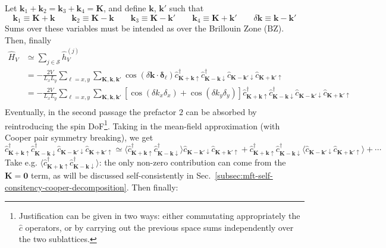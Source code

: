 Let $\mathbf{k}_1 + \mathbf{k}_2 = \mathbf{k}_3 + \mathbf{k}_4 = \mathbf{K}$, and define $\mathbf{k}$, $\mathbf{k}'$ such that
\[
	\mathbf{k}_1 \equiv \mathbf{K} + \mathbf{k} 
	\qquad
	\mathbf{k}_2 \equiv \mathbf{K} - \mathbf{k} 
	\qquad
	\mathbf{k}_3 \equiv \mathbf{K} - \mathbf{k}' 
	\qquad
	\mathbf{k}_4 \equiv \mathbf{K} + \mathbf{k}'
	\qquad
	\delta \mathbf{k} \equiv \mathbf{k}-\mathbf{k}'
\]
Sums over these variables must be intended as over the Brillouin Zone ($\mathrm{BZ}$). Then, finally
\[
\begin{aligned}
	\hat H_V &\simeq \sum_{j \in \mathcal{S}} \hat h_V^{(j)} \\
	&= - \frac{2V}{L_x L_y} \sum_{\ell = x,y} \sum_{\mathbf{K}, \mathbf{k}, \mathbf{k}'} \cos\left(
	\delta \mathbf{k} \cdot \bm{\delta}_\ell
	\right)	\hat c_{\mathbf{K}+\mathbf{k} \uparrow}^\dagger \hat c_{\mathbf{K}-\mathbf{k} \downarrow}^\dagger \hat c_{\mathbf{K}-\mathbf{k}' \downarrow} \hat c_{\mathbf{K}+\mathbf{k}'\uparrow} \\
	&= - \frac{2V}{L_x L_y} \sum_{\ell = x,y} \sum_{\mathbf{K}, \mathbf{k}, \mathbf{k}'} \left[
		\cos \left(
			\delta k_x \delta_x
		\right)	+ \cos \left(
			\delta k_y \delta_y
		\right)	
	\right]	\hat c_{\mathbf{K}+\mathbf{k} \uparrow}^\dagger \hat c_{\mathbf{K}-\mathbf{k} \downarrow}^\dagger \hat c_{\mathbf{K}-\mathbf{k}' \downarrow} \hat c_{\mathbf{K}+\mathbf{k}'\uparrow} \\
\end{aligned}
\]
Eventually, in the second passage the prefactor $2$ can be absorbed by reintroducing the spin DoF\footnote{
	Justification can be given in two ways: either commutating appropriately the $\hat c$ operators, or by carrying out the previous space sums independently over the two sublattices.
}. Taking in the mean-field approximation (with Cooper pair symmetry breaking), we get
\[
	\hat c_{\mathbf{K}+\mathbf{k} \uparrow}^\dagger \hat c_{\mathbf{K}-\mathbf{k} \downarrow}^\dagger \hat c_{\mathbf{K}-\mathbf{k}' \downarrow} \hat c_{\mathbf{K}+\mathbf{k}'\uparrow} \simeq \langle
		\hat c_{\mathbf{K}+\mathbf{k} \uparrow}^\dagger \hat c_{\mathbf{K}-\mathbf{k} \downarrow}^\dagger
	\rangle \hat c_{\mathbf{K}-\mathbf{k}' \downarrow} \hat c_{\mathbf{K}+\mathbf{k}'\uparrow} + \hat c_{\mathbf{K}+\mathbf{k} \uparrow}^\dagger \hat c_{\mathbf{K}-\mathbf{k} \downarrow}^\dagger \langle 
		\hat c_{\mathbf{K}-\mathbf{k}' \downarrow} \hat c_{\mathbf{K}+\mathbf{k}'\uparrow}
	\rangle + \cdots
\]
Take e.g. $\langle \hat c_{\mathbf{K}+\mathbf{k} \uparrow}^\dagger \hat c_{\mathbf{K}-\mathbf{k} \downarrow}^\dagger \rangle$: the only non-zero contribution can come from the $\mathbf{K}=\mathbf{0}$ term, as will be discussed self-consistently in Sec.~\ref{subsec:mft-self-consitency-cooper-decomposition}. Then finally:
